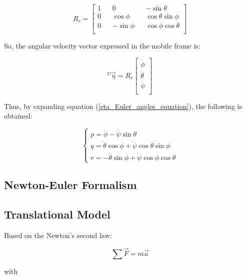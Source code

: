 \documentclass{thesisreport}
\begin{document}
\begin{equation}
R_r = \begin{bmatrix}
1 && 0 && -\sin \theta \\
0 && \cos \phi && \cos \theta \sin \phi \\
0 && -\sin \phi && \cos \phi \cos \theta \\
\end{bmatrix}
\end{equation}


So, the angular velocity vector expressed in the mobile frame is: 

\begin{equation}
{}^{U}\overrightarrow{\eta}= R_r \begin{bmatrix}
\dot{\phi} \\
\dot{\theta} \\
\dot{\psi} \\
\end{bmatrix}
\end{equation}

Thus, by expanding equation (\ref{eta_Euler_angles_equation}), the following is obtained:

\begin{equation}\label{p_q_r}
	\begin{cases}
		p = \dot{\phi} - \dot{\psi} \sin \theta \\
		q = \dot{\theta} \cos \phi + \dot{\psi} \cos{\theta} \sin{\phi}\\
		r = -\dot{\theta}\sin{\phi} + \dot{\psi} \cos{\phi} \cos{\theta}
	\end{cases}
\end{equation}


\newpage

\subsection{Newton-Euler Formalism}\label{N_E_section}

\subsection*{Translational Model}

Based on the Newton's second law:

\begin{equation}
	\sum \overrightarrow{F}=m\overrightarrow{a}
\end{equation}

with
\end{document}

